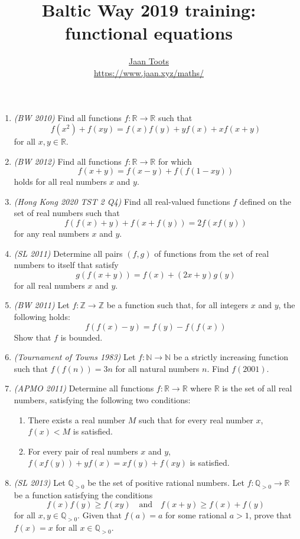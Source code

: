 \documentclass[a4paper]{article}
\title{Baltic Way 2019 training: functional equations}
\author{\href{mailto:jaan@jaan.xyz}{Jaan Toots} \\
\url{https://www.jaan.xyz/maths/}}
\date{\DTMdate{2019-11-14}}
\newcommand{\reals}{\ensuremath{\mathbb{R}}}
\newcommand{\ints}{\ensuremath{\mathbb{Z}}}
\newcommand{\nats}{\ensuremath{\mathbb{N}}}
\newcommand{\rats}{\ensuremath{\mathbb{Q}}}
\begin{document}
\maketitle

\begin{enumerate}

\item \emph{(BW 2010)} Find all functions $f : \reals \to \reals$ such that
$$ f(x^2) +f(xy) =f(x)f(y) +yf(x) +xf(x+y) $$ for all $x,y \in \reals$.

\item \emph{(BW 2012)} Find all functions $f : \reals \to \reals$ for
which $$f(x+y) = f(x-y) + f(f(1-xy))$$ holds for all real numbers $x$ and $y$.

\item \emph{(Hong Kong 2020 TST 2 Q4)} Find all real-valued functions $f$
defined on the set of real numbers such that $$f(f(x)+y)+f(x+f(y))=2f(xf(y))$$
for any real numbers $x$ and $y$.

\item \emph{(SL 2011)} Determine all pairs $(f, g)$ of functions from the set
of real numbers to itself that satisfy $$g(f(x+y)) = f(x) + (2x+y)g(y)$$ for
all real numbers $x$ and $y$.

\item \emph{(BW 2011)} Let $f : \ints \to \ints$ be a function such that, for
all integers $x$ and $y$, the following holds: $$ f(f(x)-y) = f(y)-f(f(x)) $$
Show that $f$ is bounded.

\item \emph{(Tournament of Towns 1983)} Let $f: \nats \to \nats$ be a strictly
increasing function such that $f(f(n))=3n$ for all natural numbers $n$. Find
$f(2001)$.

\item \emph{(APMO 2011)} Determine all functions $f : \reals \to \reals$ where
\reals{} is the set of all real numbers, satisfying the following two conditions:
\begin{enumerate}
\item There exists a real number $M$ such that for every real number $x$, $f(x)
< M$ is satisfied.
\item For every pair of real numbers $x$ and $y$, $f(xf(y))+yf(x) =
xf(y)+f(xy)$ is satisfied.
\end{enumerate}

\item \emph{(SL 2013)} Let $\rats_{>0}$ be the set of positive rational
numbers. Let $f : \rats_{>0} \to \reals$ be a function satisfying the
conditions $$f(x)f(y) \ge f(xy) \quad\text{and}\quad f(x+y) \ge f(x)+f(y)$$ for
all $x,y \in \rats_{>0}$. Given that $f(a) = a$ for some rational $a > 1$,
prove that $f(x) = x$ for all $x \in \rats_{>0}$.


\end{enumerate}
\end{document}
